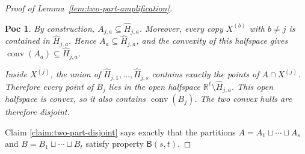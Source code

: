 \documentclass[10pt,a4paper]{amsart}
\newtheorem{poc}{Poc}
\newcommand{\R}{\mathbb{R}}
\begin{document}
\begin{proof}[Proof of Lemma~\ref{lem:two-part-amplification}]
\begin{poc}
By construction, \(A_{j,a}\subseteq\widehat H_{j,a}\). Moreover, every copy \(X^{(b)}\) with \(b\ne j\) is contained in \(\widehat H_{j,a}\). Hence \(A_{a}\subseteq\widehat H_{j,a}\), and the convexity of this halfspace gives \(\operatorname{conv}(A_{a})\subseteq\widehat H_{j,a}\).

Inside \(X^{(j)}\), the union of \(\widehat H_{j,1},\ldots,\widehat H_{j,s}\) contains exactly the points of \(A\cap X^{(j)}\). Therefore every point of \(B_{j}\) lies in the open halfspace \(\R^{\ell}\setminus\widehat H_{j,a}\). This open halfspace is convex, so it also contains \(\operatorname{conv}(B_{j})\). The two convex hulls are therefore disjoint.
\end{poc}

Claim \ref{claim:two-part-disjoint} says exactly that the partitions \(A=A_{1}\sqcup\cdots\sqcup A_{s}\) and \(B=B_{1}\sqcup\cdots\sqcup B_{t}\) satisfy property \(\mathsf{B}(s,t)\).
\end{proof}
\end{document}
